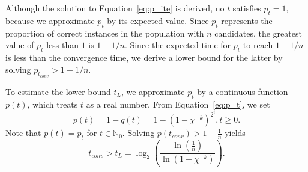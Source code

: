 \documentclass{sig-alternate}
\begin{document}
Although the solution to Equation~\ref{eq:p_ite} is derived,
no $t$ satisfies $p_t=1$,
because we approximate $p_t$ by its expected value.
Since $p_t$ represents the proportion of correct instances in the population with $n$ candidates,
the greatest value of $p_t$ less than $1$ is $1-1/n$. %
Since the expected time for $p_t$ to reach $1-1/n$ is less than the convergence time,
we derive a lower bound for the latter by solving $p_{t_{conv}} > 1-1/n$.

To estimate the lower bound $t_L$,
we approximate $p_t$ by a continuous function
$p\left(t\right)$, which treats $t$ as a real number.
From Equation~\ref{eq:p_t}, we set
\begin{equation}
p\left(t\right) = 1 - q\left(t\right) = 1 - \left(1-\chi^{-k}\right)^{2^t}, t \geq 0.
\end{equation}
Note that $p\left(t\right) = p_t$ for $t\in{\mathbb N}_0$.
Solving $p\left(t_{conv}\right)>1-\frac{1}{n}$ yields
\begin{equation} \label{eq:conv1}
t_{conv} > t_L = \log_2 \left(\frac{\ln\left( \frac{1}{n}\right)}{\ln\left(1-\chi^{-k}\right)}\right).
\end{equation}


%
\end{document}
